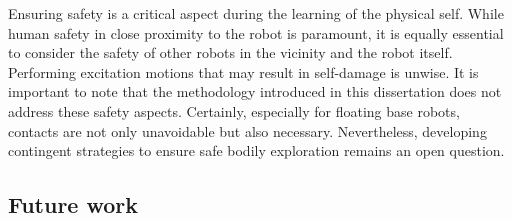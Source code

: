 \documentclass[12pt, a4paper]{article}
\newcommand{\redtext}[1]{\textcolor{red}{#1}}
\begin{document}
Ensuring safety is a critical aspect during the learning of the physical self. While human safety in close proximity to the robot is paramount, it is equally essential to consider the safety of other robots in the vicinity and the robot itself. Performing excitation motions that may result in self-damage is unwise. It is important to note that the methodology introduced in this dissertation does not address these safety aspects. Certainly, especially for floating base robots, contacts are not only unavoidable but also necessary. Nevertheless, developing contingent strategies to ensure safe bodily exploration remains an open question.

 \subsection*{Future work}

%
%
\end{document}
